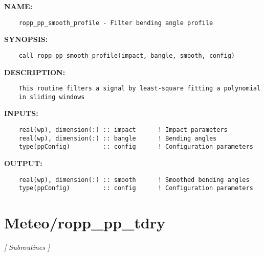 \label{ch:robo31}
\label{ch:IonosphericCorrection_ropp_pp_smooth_profile}
\textbf{NAME:}\hspace{0.08in}\begin{Verbatim}
    ropp_pp_smooth_profile - Filter bending angle profile 
\end{Verbatim}
\textbf{SYNOPSIS:}\hspace{0.08in}\begin{Verbatim}
    call ropp_pp_smooth_profile(impact, bangle, smooth, config)
\end{Verbatim}
\textbf{DESCRIPTION:}\hspace{0.08in}\begin{Verbatim}
    This routine filters a signal by least-square fitting a polynomial
    in sliding windows
\end{Verbatim}
\textbf{INPUTS:}\hspace{0.08in}\begin{Verbatim}
    real(wp), dimension(:) :: impact      ! Impact parameters 
    real(wp), dimension(:) :: bangle      ! Bending angles
    type(ppConfig)         :: config      ! Configuration parameters 
\end{Verbatim}
\textbf{OUTPUT:}\hspace{0.08in}\begin{Verbatim}
    real(wp), dimension(:) :: smooth      ! Smoothed bending angles 
    type(ppConfig)         :: config      ! Configuration parameters 
\end{Verbatim}
\section{Meteo/ropp\_pp\_tdry}
\textsl{[ Subroutines ]}

